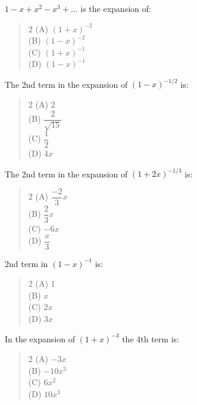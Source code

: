 \documentclass[11pt,a4paper]{article}
\begin{document}
\begin{mcqlist}
\item $1-x+x^2-x^3+\ldots$ is the expansion of:
\begin{quote}\begin{multicols}{2}
\noindent (A) $(1+x)^{-2}$ \\
(B) $(1-x)^{-2}$ \\
(C) $(1+x)^{-1}$ \\
(D) $(1-x)^{-1}$
\end{multicols}\end{quote}

\item The 2nd term in the expansion of $(1-x)^{-1/2}$ is:
\begin{quote}\begin{multicols}{2}
\noindent (A) 2 \\
(B) $\dfrac{2}{\sqrt{15}}$ \\
(C) $\dfrac{1}{2}$ \\
(D) $4x$
\end{multicols}\end{quote}

\item The 2nd term in the expansion of $(1+2x)^{-1/3}$ is:
\begin{quote}\begin{multicols}{2}
\noindent (A) $\dfrac{-2}{3}x$ \\
(B) $\dfrac{2}{3}x$ \\
(C) $-6x$ \\
(D) $\dfrac{x}{3}$
\end{multicols}\end{quote}

\item 2nd term in $(1-x)^{-1}$ is:
\begin{quote}\begin{multicols}{2}
\noindent (A) 1 \\
(B) $x$ \\
(C) $2x$ \\
(D) $3x$
\end{multicols}\end{quote}

\item In the expansion of $(1+x)^{-3}$ the 4th term is:
\begin{quote}\begin{multicols}{2}
\noindent (A) $-3x$ \\
(B) $-10x^3$ \\
(C) $6x^2$ \\
(D) $10x^3$
\end{multicols}\end{quote}


\end{mcqlist}
\end{document}

